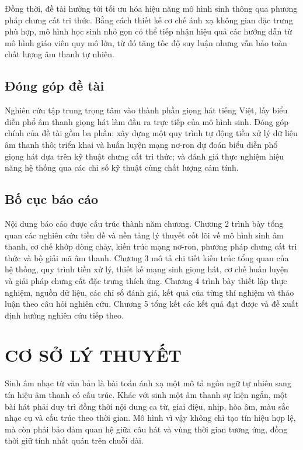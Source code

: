 \documentclass[a4paper,13pt,oneside]{report}
\begin{document}
Đồng thời, đề tài hướng tới tối ưu hóa hiệu năng mô hình sinh thông qua phương pháp chưng cất tri thức. Bằng cách thiết kế cơ chế ánh xạ không gian đặc trưng phù hợp, mô hình học sinh nhỏ gọn có thể tiếp nhận hiệu quả các hướng dẫn từ mô hình giáo viên quy mô lớn, từ đó tăng tốc độ suy luận nhưng vẫn bảo toàn chất lượng âm thanh tự nhiên.

\section{Đóng góp đề tài}
\label{section:scope}

Nghiên cứu tập trung trọng tâm vào thành phần giọng hát tiếng Việt, lấy biểu diễn phổ âm thanh giọng hát làm đầu ra trực tiếp của mô hình sinh. Đóng góp chính của đề tài gồm ba phần: xây dựng một quy trình tự động tiền xử lý dữ liệu âm thanh thô; triển khai và huấn luyện mạng nơ-ron dự đoán biểu diễn phổ giọng hát dựa trên kỹ thuật chưng cất tri thức; và đánh giá thực nghiệm hiệu năng hệ thống qua các chỉ số kỹ thuật cùng chất lượng cảm tính.

\section{Bố cục báo cáo}
\label{section:report-structure}

Nội dung báo cáo được cấu trúc thành năm chương. Chương 2 trình bày tổng quan các nghiên cứu tiền đề và nền tảng lý thuyết cốt lõi về mô hình sinh âm thanh, cơ chế khớp dòng chảy, kiến trúc mạng nơ-ron, phương pháp chưng cất tri thức và bộ giải mã âm thanh. Chương 3 mô tả chi tiết kiến trúc tổng quan của hệ thống, quy trình tiền xử lý, thiết kế mạng sinh giọng hát, cơ chế huấn luyện và giải pháp chưng cất đặc trưng thích ứng. Chương 4 trình bày thiết lập thực nghiệm, nguồn dữ liệu, các chỉ số đánh giá, kết quả của từng thí nghiệm và thảo luận theo câu hỏi nghiên cứu. Chương 5 tổng kết các kết quả đạt được và đề xuất định hướng nghiên cứu tiếp theo.


\chapter{CƠ SỞ LÝ THUYẾT}
\label{chapter:related}

Sinh âm nhạc từ văn bản là bài toán ánh xạ một mô tả ngôn ngữ tự nhiên sang tín hiệu âm thanh có cấu trúc. Khác với sinh một âm thanh sự kiện ngắn, một bài hát phải duy trì đồng thời nội dung ca từ, giai điệu, nhịp, hòa âm, màu sắc nhạc cụ và cấu trúc theo thời gian. Mô hình vì vậy không chỉ tạo tín hiệu hợp lệ, mà còn phải bảo đảm quan hệ giữa câu hát và vùng thời gian tương ứng, đồng thời giữ tính nhất quán trên chuỗi dài.
\end{document}

